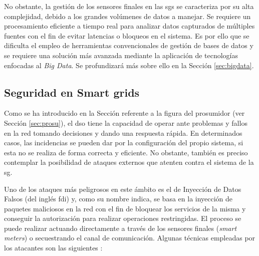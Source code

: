\vspace{3mm}

No obstante, la gestión de los sensores finales en las \gls{sg}s se caracteriza por su alta complejidad, debido a los grandes volúmenes de datos a manejar. Se requiere un procesamiento eficiente a tiempo real para analizar datos capturados de múltiples fuentes con el fin de evitar latencias o bloqueos en el sistema. Es por ello que se dificulta el empleo de herramientas convencionales de gestión de bases de datos y se requiere una solución más avanzada mediante la aplicación de tecnologías enfocadas al \textit{Big Data}. Se profundizará más sobre ello en la Sección \ref{sec:bigdata}.


\subsection{Seguridad en Smart grids}
\label{sec:seg}
 
Como se ha introducido en la Sección referente a la figura del prosumidor (ver Sección \ref{sec:prosu}), el \gls{dso} tiene la capacidad de operar ante problemas y fallos en la red tomando decisiones y dando una respuesta rápida. En determinados casos, las incidencias se pueden dar por la configuración del propio sistema, si esta no se realiza de forma correcta y eficiente. No obstante, también es preciso contemplar la posibilidad de ataques externos que atenten contra el sistema de la \gls{sg}.

\vspace{3mm}

Uno de los ataques más peligrosos en este ámbito es el de Inyección de Datos Falsos (del inglés \gls{fdi}) \cite{baddata} y, como su nombre indica, se basa en la inyección de paquetes maliciosos en la red con el fin de bloquear los servicios de la misma y conseguir la autorización para realizar operaciones restringidas. El proceso se puede realizar actuando directamente a través de los sensores finales (\textit{smart meters}) o secuestrando el canal de comunicación. Algunas técnicas empleadas por los atacantes son las siguientes \cite{baddata}:

